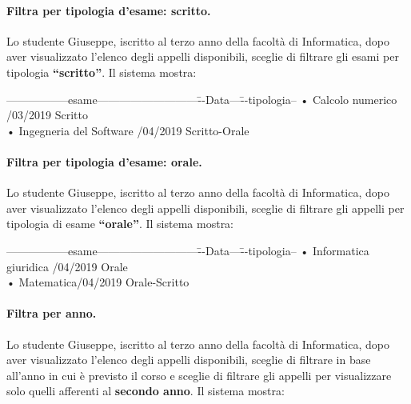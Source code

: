 \paragraph{Filtra per tipologia d’esame: scritto.}
Lo studente Giuseppe, iscritto al terzo anno della facoltà di Informatica, dopo aver visualizzato l’elenco degli appelli disponibili, sceglie di filtrare gli esami per tipologia \textbf{“scritto”}. Il sistema mostra:  

 \begin{tabbing}
	\hspace{1cm}-----------------esame---------------------------\=--Data---\= --tipologia--\kill
	\hspace{1cm} • Calcolo numerico  /03/2019 \> Scritto \\
	\hspace{1cm} • Ingegneria del Software /04/2019 \> Scritto-Orale  \\
\end{tabbing}

\paragraph{Filtra per tipologia d’esame: orale.}
Lo studente Giuseppe, iscritto al terzo anno della facoltà di Informatica, dopo aver visualizzato l’elenco degli appelli disponibili, sceglie di filtrare gli appelli per tipologia di esame \textbf{“orale”}. Il sistema mostra:

 \begin{tabbing}
	\hspace{1cm}-----------------esame---------------------------\=--Data---\= --tipologia--\kill
	\hspace{1cm} • Informatica giuridica  /04/2019\> Orale \\
	\hspace{1cm} • Matematica/04/2019 \> Orale-Scritto  \\
\end{tabbing}

\paragraph{Filtra per anno.}
Lo studente Giuseppe, iscritto al terzo anno della facoltà di Informatica, dopo aver visualizzato l’elenco degli appelli disponibili, sceglie di filtrare in base all'anno in cui è previsto il corso e sceglie di filtrare gli appelli per visualizzare solo quelli afferenti al \textbf{secondo anno}. Il sistema mostra:

